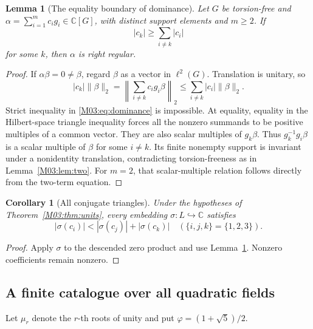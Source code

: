 \documentclass[11pt,a4paper,oneside]{report}
\newtheorem{lemma}[theorem]{Lemma}
\newtheorem{corollary}[theorem]{Corollary}
\theoremstyle{definition}
\theoremstyle{remark}
\newcommand{\C}{\mathbb C}
\newcommand{\ph}{\varphi}
\begin{document}
\begin{lemma}[The equality boundary of dominance]\label{M03:lem:dominance}
Let \(G\) be torsion-free and \(\alpha=\sum_{i=1}^m c_i g_i\in\C[G]\), with distinct support elements and \(m\ge2\). If
\begin{equation}\label{M03:eq:dominance}
|c_k|\ge\sum_{i\ne k}|c_i|
\end{equation}
for some \(k\), then \(\alpha\) is right regular.
\end{lemma}
\begin{proof}
If \(\alpha\beta=0\ne\beta\), regard \(\beta\) as a vector in \(\ell^2(G)\). Translation is unitary, so
\[
|c_k|\|\beta\|_2
=\left\|\sum_{i\ne k}c_i g_i\beta\right\|_2
\le\sum_{i\ne k}|c_i|\|\beta\|_2.
\]
Strict inequality in \eqref{M03:eq:dominance} is impossible. At equality, equality in the Hilbert-space triangle inequality forces all the nonzero summands to be positive multiples of a common vector. They are also scalar multiples of \(g_k\beta\). Thus \(g_k^{-1}g_i\beta\) is a scalar multiple of \(\beta\) for some \(i\ne k\). Its finite nonempty support is invariant under a nonidentity translation, contradicting torsion-freeness as in Lemma~\ref{M03:lem:two}. For \(m=2\), that scalar-multiple relation follows directly from the two-term equation.
\end{proof}

\begin{corollary}[All conjugate triangles]\label{M03:cor:triangle}
Under the hypotheses of Theorem~\ref{M03:thm:units}, every embedding \(\sigma:L\hookrightarrow\C\) satisfies
\[
|\sigma(c_i)|<|\sigma(c_j)|+|\sigma(c_k)|
\quad(\{i,j,k\}=\{1,2,3\}).
\]
\end{corollary}
\begin{proof}
Apply \(\sigma\) to the descended zero product and use Lemma~\ref{M03:lem:dominance}. Nonzero coefficients remain nonzero.
\end{proof}

\subsection{A finite catalogue over all quadratic fields}
Let \(\mu_r\) denote the \(r\)-th roots of unity and put \(\ph=(1+\sqrt5)/2\).
\end{document}
